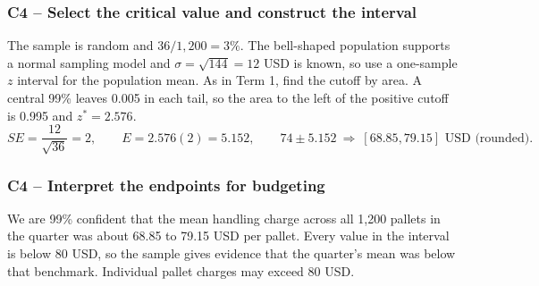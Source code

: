 
	\label{sol:c4-2-a}
	\subsubsection*{C4 -- Select the critical value and construct the interval}

	The sample is random and $36/1{,}200=3\%$. The bell-shaped population supports a normal sampling model and $\sigma=\sqrt{144}=12$ USD is known, so use a one-sample $z$ interval for the population mean. As in Term 1, find the cutoff by area. A central 99\% leaves 0.005 in each tail, so the area to the left of the positive cutoff is 0.995 and $z^*=2.576$.
	\[
	SE=\frac{12}{\sqrt{36}}=2,\qquad E=2.576(2)=5.152,\qquad
	74\pm 5.152\ \Longrightarrow\ [68.85,79.15]\text{ USD (rounded)}.
	\]


	\label{sol:c4-2-b}
	\subsubsection*{C4 -- Interpret the endpoints for budgeting}

	We are 99\% confident that the mean handling charge across all 1,200 pallets in the quarter was about 68.85 to 79.15 USD per pallet. Every value in the interval is below 80 USD, so the sample gives evidence that the quarter's mean was below that benchmark. Individual pallet charges may exceed 80 USD.




